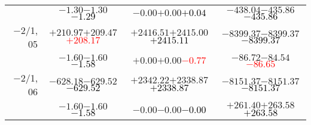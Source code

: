 \documentclass[compress]{beamer}
\begin{document}
\begin{frame}
{\begin{tabular}{r | c | c | c}
           & $-1.30$\hspace{0.1 cm}$-1.30$\hspace{0.1 cm}\textcolor{black}{$-1.29$} & $-0.00$\hspace{0.1 cm}$+0.00$\hspace{0.1 cm}\textcolor{black}{$+0.04$} & $-438.04$\hspace{0.1 cm}$-435.86$\hspace{0.1 cm}\textcolor{black}{$-435.86$} \\
$-$2/1, 05 & $+210.97$\hspace{0.1 cm}$+209.47$\hspace{0.1 cm}\textcolor{red}{$+208.17$} & $+2416.51$\hspace{0.1 cm}$+2415.00$\hspace{0.1 cm}\textcolor{black}{$+2415.11$} & $-8399.37$\hspace{0.1 cm}$-8399.37$\hspace{0.1 cm}\textcolor{black}{$-8399.37$} \\
           & $-1.60$\hspace{0.1 cm}$-1.60$\hspace{0.1 cm}\textcolor{black}{$-1.58$} & $+0.00$\hspace{0.1 cm}$+0.00$\hspace{0.1 cm}\textcolor{red}{$-0.77$} & $-86.72$\hspace{0.1 cm}$-84.54$\hspace{0.1 cm}\textcolor{red}{$-86.65$} \\
$-$2/1, 06 & $-628.18$\hspace{0.1 cm}$-629.52$\hspace{0.1 cm}\textcolor{black}{$-629.52$} & $+2342.22$\hspace{0.1 cm}$+2338.87$\hspace{0.1 cm}\textcolor{black}{$+2338.87$} & $-8151.37$\hspace{0.1 cm}$-8151.37$\hspace{0.1 cm}\textcolor{black}{$-8151.37$} \\
           & $-1.60$\hspace{0.1 cm}$-1.60$\hspace{0.1 cm}\textcolor{black}{$-1.58$} & $-0.00$\hspace{0.1 cm}$-0.00$\hspace{0.1 cm}\textcolor{black}{$-0.00$} & $+261.40$\hspace{0.1 cm}$+263.58$\hspace{0.1 cm}\textcolor{black}{$+263.58$} \\
\end{tabular}}
\end{frame}
\end{document}

